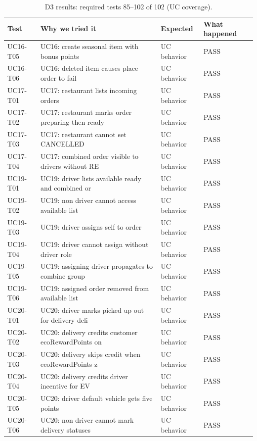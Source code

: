 \begin{table}[t]
\caption{D3 results: required tests 85--102 of 102 (UC coverage).}
\label{tab:d3r4}
\centering\scriptsize
\begin{tabular}{p{3.8cm}p{3.6cm}p{2.8cm}p{2.0cm}}
\toprule
Test & Why we tried it & Expected & What happened \\
\midrule
UC16-T05 & UC16: create seasonal item with bonus points & UC behavior & PASS \\
UC16-T06 & UC16: deleted item causes place order to fail & UC behavior & PASS \\
UC17-T01 & UC17: restaurant lists incoming orders & UC behavior & PASS \\
UC17-T02 & UC17: restaurant marks order preparing then ready & UC behavior & PASS \\
UC17-T03 & UC17: restaurant cannot set CANCELLED & UC behavior & PASS \\
UC17-T04 & UC17: combined order visible to drivers without RE & UC behavior & PASS \\
UC19-T01 & UC19: driver lists available ready and combined or & UC behavior & PASS \\
UC19-T02 & UC19: non driver cannot access available list & UC behavior & PASS \\
UC19-T03 & UC19: driver assigns self to order & UC behavior & PASS \\
UC19-T04 & UC19: driver cannot assign without driver role & UC behavior & PASS \\
UC19-T05 & UC19: assigning driver propagates to combine group & UC behavior & PASS \\
UC19-T06 & UC19: assigned order removed from available list & UC behavior & PASS \\
UC20-T01 & UC20: driver marks picked up out for delivery deli & UC behavior & PASS \\
UC20-T02 & UC20: delivery credits customer ecoRewardPoints on & UC behavior & PASS \\
UC20-T03 & UC20: delivery skips credit when ecoRewardPoints z & UC behavior & PASS \\
UC20-T04 & UC20: delivery credits driver incentive for EV & UC behavior & PASS \\
UC20-T05 & UC20: driver default vehicle gets five points & UC behavior & PASS \\
UC20-T06 & UC20: non driver cannot mark delivery statuses & UC behavior & PASS \\
\bottomrule
\end{tabular}
\end{table}

